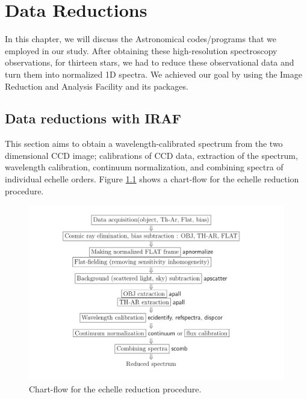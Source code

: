 \chapter{Data Reductions}\label{chap:introduction}

In this chapter, we will discuss the Astronomical codes/programs that we employed in our study. After obtaining these high-resolution spectroscopy observations, for thirteen stars, we had to reduce these observational data and turn them into normalized 1D spectra. We achieved our goal by using the Image Reduction and Analysis Facility \citep[][hereafter IRAF]{1986SPIE..627..733T, 1993ASPC...52..173T} and its packages.


\section{Data reductions with IRAF}
This section aims to obtain a wavelength-calibrated spectrum from the two dimensional CCD image; calibrations of CCD data, extraction of the spectrum, wavelength calibration, continuum normalization, and combining spectra of individual echelle orders. Figure \ref{chart} shows a chart-flow for the echelle reduction procedure.

\vspace{5mm}
\begin{figure}[!ht]
\centering
\includegraphics[width=\textwidth, angle=0]{Img/flow-chart.png}
\caption{Chart-flow for the echelle reduction procedure.} 
\label{chart}
\end{figure}

\newpage

